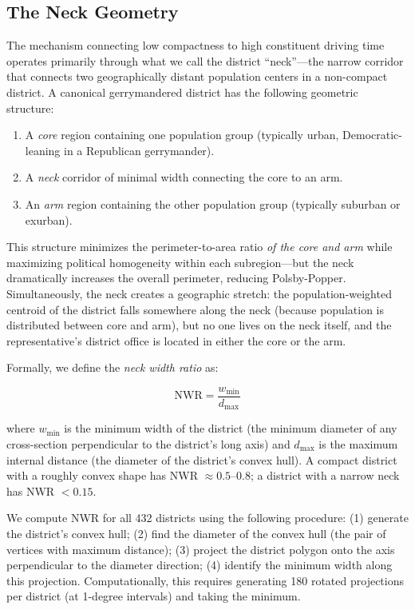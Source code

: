 \label{sec:mechanism}

\subsection{The Neck Geometry}

The mechanism connecting low compactness to high constituent driving time operates
primarily through what we call the district ``neck''---the narrow corridor that
connects two geographically distant population centers in a non-compact district.
A canonical gerrymandered district has the following geometric structure:

\begin{enumerate}
\item A \textit{core} region containing one population group (typically urban, Democratic-leaning
  in a Republican gerrymander).
\item A \textit{neck} corridor of minimal width connecting the core to an arm.
\item An \textit{arm} region containing the other population group (typically suburban
  or exurban).
\end{enumerate}

This structure minimizes the perimeter-to-area ratio \textit{of the core and arm} while
maximizing political homogeneity within each subregion---but the neck dramatically
increases the overall perimeter, reducing Polsby-Popper. Simultaneously, the neck
creates a geographic stretch: the population-weighted centroid of the district falls
somewhere along the neck (because population is distributed between core and arm),
but no one lives on the neck itself, and the representative's district office is
located in either the core or the arm.

Formally, we define the \textit{neck width ratio} as:

\begin{equation}
\text{NWR} = \frac{w_{\text{min}}}{d_{\text{max}}}
\end{equation}

where $w_{\text{min}}$ is the minimum width of the district (the minimum diameter of
any cross-section perpendicular to the district's long axis) and $d_{\text{max}}$ is
the maximum internal distance (the diameter of the district's convex hull). A compact
district with a roughly convex shape has NWR $\approx 0.5$--$0.8$; a district with
a narrow neck has NWR $< 0.15$.

We compute NWR for all 432 districts using the following procedure:
(1) generate the district's convex hull; (2) find the diameter of the convex hull
(the pair of vertices with maximum distance); (3) project the district polygon onto
the axis perpendicular to the diameter direction; (4) identify the minimum width along
this projection. Computationally, this requires generating 180 rotated projections
per district (at 1-degree intervals) and taking the minimum.


